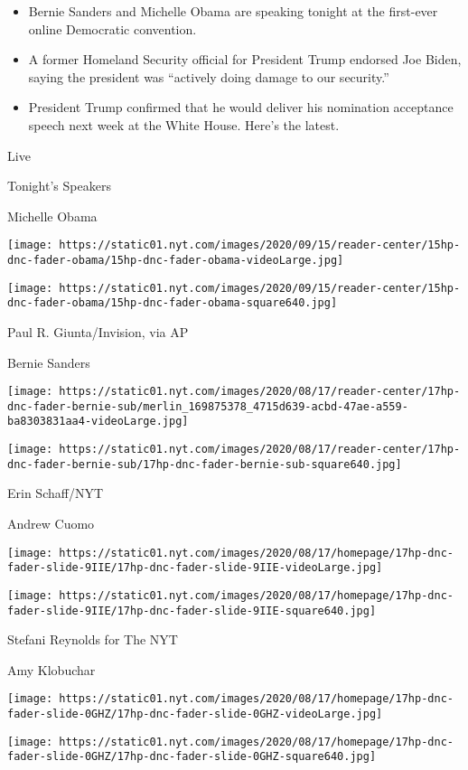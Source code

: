 \begin{itemize}
\tightlist
\item
  Bernie Sanders and Michelle Obama are speaking tonight at the
  first-ever online Democratic convention.
\item
  A former Homeland Security official for President Trump endorsed Joe
  Biden, saying the president was ``actively doing damage to our
  security.''
\item
  President Trump confirmed that he would deliver his nomination
  acceptance speech next week at the White House. Here's the latest.
\end{itemize}

Live

\href{https://www.nytimes.com/article/dnc-schedule.html}{}

Tonight's Speakers

Michelle Obama

\texttt{[image: https://static01.nyt.com/images/2020/09/15/reader-center/15hp-dnc-fader-obama/15hp-dnc-fader-obama-videoLarge.jpg]}

\texttt{[image: https://static01.nyt.com/images/2020/09/15/reader-center/15hp-dnc-fader-obama/15hp-dnc-fader-obama-square640.jpg]}

 Paul R. Giunta/Invision, via AP

Bernie Sanders

\texttt{[image: https://static01.nyt.com/images/2020/08/17/reader-center/17hp-dnc-fader-bernie-sub/merlin\_169875378\_4715d639-acbd-47ae-a559-ba8303831aa4-videoLarge.jpg]}

\texttt{[image: https://static01.nyt.com/images/2020/08/17/reader-center/17hp-dnc-fader-bernie-sub/17hp-dnc-fader-bernie-sub-square640.jpg]}

 Erin Schaff/NYT

Andrew Cuomo

\texttt{[image: https://static01.nyt.com/images/2020/08/17/homepage/17hp-dnc-fader-slide-9IIE/17hp-dnc-fader-slide-9IIE-videoLarge.jpg]}

\texttt{[image: https://static01.nyt.com/images/2020/08/17/homepage/17hp-dnc-fader-slide-9IIE/17hp-dnc-fader-slide-9IIE-square640.jpg]}

 Stefani Reynolds for The NYT

Amy Klobuchar

\texttt{[image: https://static01.nyt.com/images/2020/08/17/homepage/17hp-dnc-fader-slide-0GHZ/17hp-dnc-fader-slide-0GHZ-videoLarge.jpg]}

\texttt{[image: https://static01.nyt.com/images/2020/08/17/homepage/17hp-dnc-fader-slide-0GHZ/17hp-dnc-fader-slide-0GHZ-square640.jpg]}

